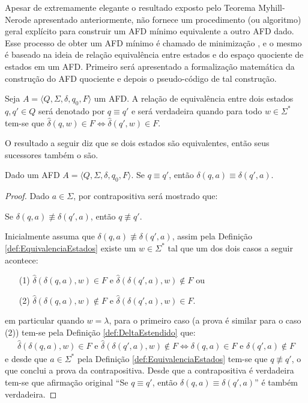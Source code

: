 Apesar de extremamente elegante o resultado exposto pelo Teorema Myhill-Nerode apresentado anteriormente, não fornece um procedimento (ou algoritmo) geral explícito para construir um AFD mínimo equivalente a outro AFD dado. Esse processo de obter um AFD mínimo é chamado de minimização \cite{benjaLivro2010}, e o mesmo é baseado na ideia de relação equivalência entre estados e do espaço quociente de estados em um AFD. Primeiro será apresentado a formalização matemática da construção do AFD quociente e depois o pseudo-código de tal construção.

\begin{definition}\label{def:EquivalenciaEstados}
	Seja $A = \langle Q, \Sigma, \delta, q_0, F\rangle$ um AFD. A relação de equivalência entre dois estados $q, q' \in Q$ será denotado por $q \equiv q'$ e será verdadeira quando para todo $w \in \Sigma^*$ tem-se que $\widehat{\delta}(q, w) \in F \Longleftrightarrow \widehat{\delta}(q', w) \in F$.
\end{definition} 

O resultado a seguir diz que se dois estados são equivalentes, então seus sucessores também o são.

\begin{lemma}\label{lema:SucessoresEquivalentes}
	Dado um AFD $A = \langle Q, \Sigma, \delta, q_0, F\rangle$. Se $q \equiv q'$, então $\delta(q, a) \equiv \delta(q', a)$.
\end{lemma}

\begin{proof}
	Dado $a \in \Sigma$, por contrapositiva será mostrado que: 
	\begin{center}
		Se $\delta(q, a) \not\equiv \delta(q', a)$, então $q \not\equiv q'$. 
	\end{center}
	Inicialmente assuma que $\delta(q, a) \not\equiv \delta(q', a)$, assim pela Definição \ref{def:EquivalenciaEstados} existe um $w \in \Sigma^*$ tal que um dos dois casos a seguir acontece:
	\begin{itemize}
		\item[(1)] $\widehat{\delta}(\delta(q, a), w)  \in F$ e $\widehat{\delta}(\delta(q', a), w)  \notin F$ ou
		\item[(2)] $\widehat{\delta}(\delta(q, a), w)  \notin F$ e $\widehat{\delta}(\delta(q', a), w)  \in F$.
	\end{itemize}
	em particular quando $w = \lambda$, para o primeiro caso (a prova é similar para o caso (2)) tem-se pela Definição \ref{def:DeltaEstendido} que:
	\begin{eqnarray*}
		\widehat{\delta}(\delta(q, a), w)  \in F \text{ e } \widehat{\delta}(\delta(q', a), w)  \notin F \Longleftrightarrow \delta(q, a)  \in F \text{ e }\delta(q', a)  \notin F
	\end{eqnarray*}
	e desde que $a \in \Sigma^*$ pela Definição \ref{def:EquivalenciaEstados} tem-se que $q \not\equiv q'$, o que conclui a prova da contrapositiva. Desde que a contrapositiva é verdadeira tem-se que afirmação original ``Se $q \equiv q'$, então $\delta(q, a) \equiv \delta(q', a)$'' é também verdadeira.
\end{proof}

